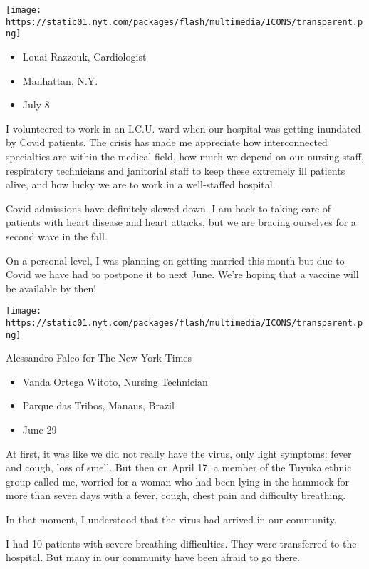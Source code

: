 \texttt{[image: https://static01.nyt.com/packages/flash/multimedia/ICONS/transparent.png]}

\begin{itemize}
\tightlist
\item
  Louai Razzouk, Cardiologist
\item
  Manhattan, N.Y.
\item
  July 8
\end{itemize}

I volunteered to work in an I.C.U. ward when our hospital was getting
inundated by Covid patients. The crisis has made me appreciate how
interconnected specialties are within the medical field, how much we
depend on our nursing staff, respiratory technicians and janitorial
staff to keep these extremely ill patients alive, and how lucky we are
to work in a well-staffed hospital.

Covid admissions have definitely slowed down. I am back to taking care
of patients with heart disease and heart attacks, but we are bracing
ourselves for a second wave in the fall.

On a personal level, I was planning on getting married this month but
due to Covid we have had to postpone it to next June. We're hoping that
a vaccine will be available by then!

\texttt{[image: https://static01.nyt.com/packages/flash/multimedia/ICONS/transparent.png]}

Alessandro Falco for The New York Times

\begin{itemize}
\tightlist
\item
  Vanda Ortega Witoto, Nursing Technician
\item
  Parque das Tribos, Manaus, Brazil
\item
  June 29
\end{itemize}

At first, it was like we did not really have the virus, only light
symptoms: fever and cough, loss of smell. But then on April 17, a member
of the Tuyuka ethnic group called me, worried for a woman who had been
lying in the hammock for more than seven days with a fever, cough, chest
pain and difficulty breathing.

In that moment, I understood that the virus had arrived in our
community.

I had 10 patients with severe breathing difficulties. They were
transferred to the hospital. But many in our community have been afraid
to go there.

